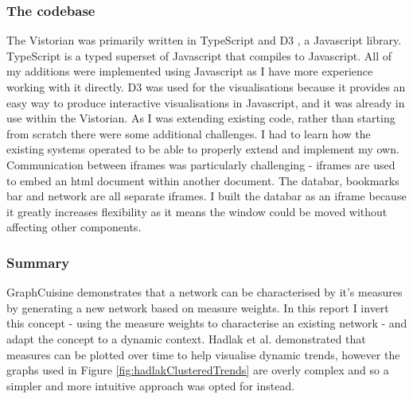 \subsubsection*{The codebase}
\label{sec:sec24}
The Vistorian was primarily written in TypeScript \cite{typescript} and D3 \cite{d3site}, a Javascript library. TypeScript is a typed superset of Javascript that compiles to Javascript. All of my additions were implemented using Javascript as I have more experience working with it directly. D3 was used for the visualisations because it provides an easy way to produce interactive visualisations in Javascript, and it was already in use within the Vistorian. 
As I was extending existing code, rather than starting from scratch there were some additional challenges. I had to learn how the existing systems operated to be able to properly extend and implement my own. Communication between iframes was particularly challenging - iframes are used to embed an html document within another document. The databar, bookmarks bar and network are all separate iframes. I built the databar as an iframe because it greatly increases flexibility as it means the window could be moved without affecting other components.


\subsubsection*{Summary}
GraphCuisine demonstrates that a network can be characterised by it's measures by generating a new network based on measure weights. In this report I invert this concept - using the measure weights to characterise an existing network - and adapt the concept to a dynamic context.
Hadlak et al. demonstrated that measures can be plotted over time to help visualise dynamic trends, however the graphs used in Figure \ref{fig:hadlakClusteredTrends} are overly complex and so a simpler and more intuitive approach was opted for instead.





